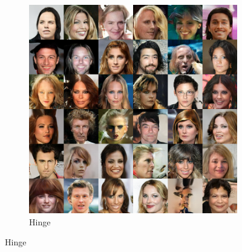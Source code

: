 \documentclass{article} %
\theoremstyle{plain}
\newtheorem*{proposition 1*}{Proposition 1}
\begin{document}
\begin{appendices}
\begin{figure}[tb]
\begin{subfigure}[t]{0.45\linewidth}
		\includegraphics[width=1\textwidth]{celebA_hinge.png}
		\caption{Hinge\label{fig:sample_celebA_hinge}}
	\end{subfigure}
	

\end{figure}
\end{appendices}
\end{document}

